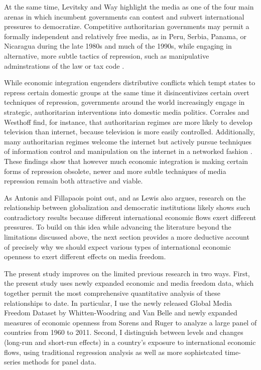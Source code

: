 \documentclass[12pt,a4paper]{article}\usepackage[]{graphicx}\usepackage[]{color}
\begin{document}
At the same time, Levitsky and Way highlight the media as one of the four main arenas in which incumbent governments can contest and subvert international pressures to democratize. Competitive authoritarian governments may permit a formally independent and relatively free media, as in Peru, Serbia, Panama, or Nicaragua during the late 1980s and much of the 1990s, while engaging in alternative, more subtle tactics of repression, such as manipulative adminstrations of the law or tax code \parencite[53, 58]{Levitsky:2002gx}.

While economic integration engenders distributive conflicts which tempt states to repress certain domestic groups at the same time it disincentivizes certain overt techniques of repression, governments around the world increasingly engage in strategic, authoritarian interventions into domestic media politics. Corrales and Westhoff \parencite*{Corrales:2006vz} find, for instance, that authoritarian regimes are more likely to develop television than internet, because television is more easily controlled. Additionally, many authoritarian regimes welcome the internet but actively pursue techniques of information control and manipulation on the internet in a networked fashion \parencites{MacKinnon:2011id}{Pearce:2012fm}. These findings show that however much economic integration is making certain forms of repression obsolete, newer and more subtle techniques of media repression remain both attractive and viable.

As Antonis and Fillapaois point out, and as Lewis also argues, research on the relationship between globalization and democratic institutions likely shows such contradictory results because different international economic flows exert different pressures. To build on this idea while advancing the literature beyond the limitations discussed above, the next section provides a more deductive account of precisely why we should expect various types of international economic openness to exert different effects on media freedom.

The present study improves on the limited previous research in two ways. First, the present study uses newly expanded economic and media freedom data, which together permit the most comprehensive quantitative analysis of these relationships to date. In particular, I use the newly released Global Media Freedom Dataset by Whitten-Woodring and Van Belle \parencites*{Belle:1997wo}{van2000press} and newly expanded measures of economic openness from Sorens and Ruger \parencite{Sorens:2012hc} to analyze a large panel of countries from 1960 to 2011. Second, I distinguish between levels and changes (long-run and short-run effects) in a country's exposure to international economic flows, using traditional regression analysis as well as more sophistcated time-series methods for panel data.
\end{document}
